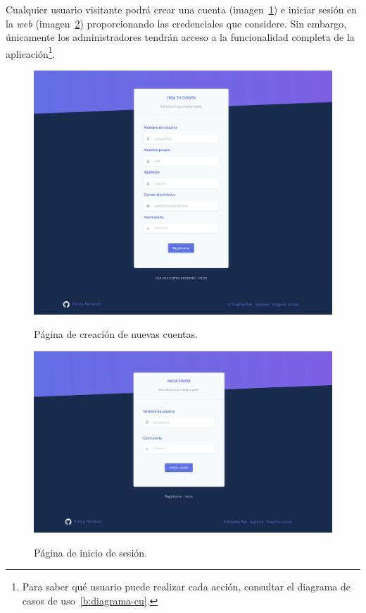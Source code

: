Cualquier usuario visitante podrá crear una cuenta (imagen~\ref{e-8:register}) e iniciar sesión en la \textit{web} (imagen~\ref{e-8:login}) proporcionando las credenciales que considere. Sin embargo, únicamente los administradores tendrán acceso a la funcionalidad completa de la aplicación\footnote{Para saber qué usuario puede realizar cada acción, consultar el diagrama de casos de uso~\ref{b:diagrama-cu}.}.

\begin{figure}[h]
	\caption[Manual de usuario: crear nueva cuenta]{Página de creación de nuevas cuentas.}
	\centering
	\includegraphics[width=\textwidth]{../img/anexos/user_guide/8_register}
	\label{e-8:register}
\end{figure}

\begin{figure}[h]
	\caption[Manual de usuario: inicio de sesión]{Página de inicio de sesión.}
	\centering
	\includegraphics[width=\textwidth]{../img/anexos/user_guide/8_login}
	\label{e-8:login}
\end{figure}

